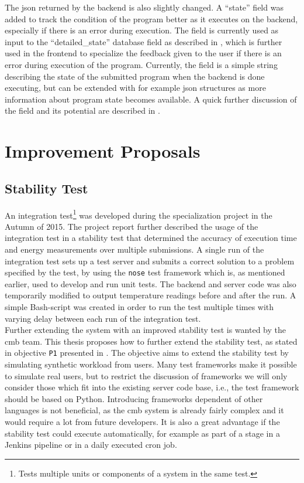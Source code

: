 The \gls{json} returned by the backend is also slightly changed. A ``state'' field was added to track the condition of the program better as it executes on the backend, especially if there is an error during execution. The field is currently used as input to the ``detailed\_state'' database field as described in , which is further used in the frontend to specialize the feedback given to the user if there is an error during execution of the program. Currently, the field is a simple string describing the state of the submitted program when the backend is done executing, but can be extended with for example \gls{json} structures as more information about program state becomes available. A quick further discussion of the field and its potential are described in .

\section{Improvement Proposals}
\label{sec:impr-proposals}

\subsection{Stability Test}
\label{sub-sec:prop-stability-test}
An integration test\footnote{Tests multiple units or components of a system in the same test.} was developed during the specialization project in the Autumn of 2015. The project report further described the usage of the integration test in a stability test that determined the accuracy of execution time and energy measurements over multiple submissions. A single run of the integration test sets up a test server and submits a correct solution to a problem specified by the test, by using the \texttt{nose} test framework which is, as mentioned earlier, used to develop and run unit tests. The backend and server code was also temporarily modified to output temperature readings before and after the run. A simple Bash-script was created in order to run the test multiple times with varying delay between each run of the integration test. \\

Further extending the system with an improved stability test is wanted by the \gls{cmb} team. This thesis proposes how to further extend the stability test, as stated in objective \texttt{P1} presented in . The objective aims to extend the stability test by simulating synthetic workload from users. Many test frameworks make it possible to simulate real users, but to restrict the discussion of frameworks we will only consider those which fit into the existing server code base, i.e., the test framework should be based on Python. Introducing frameworks dependent of other languages is not beneficial, as the \gls{cmb} system is already fairly complex and it would require a lot from future developers. It is also a great advantage if the stability test could execute automatically, for example as part of a stage in a Jenkins pipeline or in a daily executed cron job. \\

